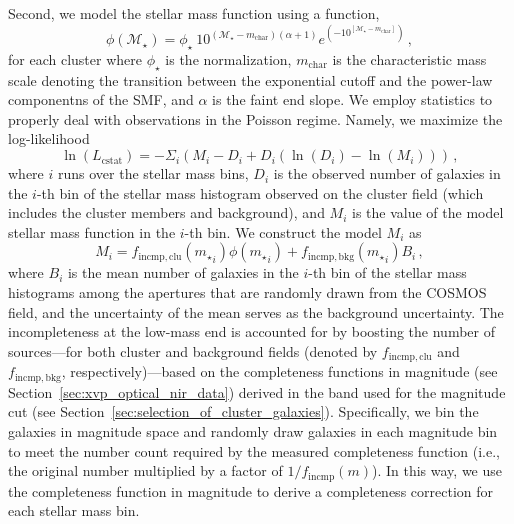 \documentclass[useAMS,usenatbib,iop,numberedappendix]{mn2e}
\newcommand{\mstar}{\ensuremath{m_{\star}}}
\begin{document}
Second, we model the stellar mass function using a \citet{schechter76} function,
\[
\phi(\mathcal{M}_{\star}) = 
\phi_{\star}~
10^{
(\mathcal{M}_{\star} - m_{\mathrm{char}})
(\alpha + 1)
} 
e^{ (-10^{[\mathcal{M}_{\star} - m_{\mathrm{char}}] }) } \, ,
\]
for each cluster where $\phi_{\star}$ is the normalization, $m_\mathrm{char}$ is the characteristic mass scale denoting the transition between the exponential cutoff and the power-law componentns of the SMF, and $\alpha$ is the faint end slope.  We employ \citet{cash79} statistics to properly deal with observations in the Poisson regime.  Namely, we maximize the log-likelihood
%
\begin{equation}
\label{eq:cstat}
\ln\left( L_{\mathrm{cstat}} \right) = -\Sigma_{i}\left( M_{i} - D_{i} + D_{i}(\ln(D_{i}) - \ln(M_{i}) ) \right) \, ,
\end{equation}
%
where $i$ runs over the stellar mass bins, $D_i$ is the observed number of galaxies in the $i$-th bin of the stellar mass histogram observed on the cluster field (which includes the cluster members and background), and $M_i$ is the value of the model stellar mass function in the $i$-th bin.
We construct the model $M_i$ as
\[
M_i = f_{\mathrm{incmp, clu}}({\mstar}_{i}) \phi({\mstar}_{i}) + f_{\mathrm{incmp, bkg}}({\mstar}_{i}) B_i  \, ,
\]
where $B_i$ is the mean number of galaxies in the $i$-th bin of the stellar mass histograms among the apertures that are randomly drawn from the COSMOS field, and the uncertainty of the mean serves as the background uncertainty.
The incompleteness at the low-mass end is accounted for by 
boosting 
the number of sources---for both cluster and background fields (denoted by $f_{\mathrm{incmp, clu}}$ and $f_{\mathrm{incmp, bkg}}$, respectively)---based on the completeness functions in magnitude (see Section~\ref{sec:xvp_optical_nir_data}) derived in the band used for the magnitude cut (see Section~\ref{sec:selection_of_cluster_galaxies}).
Specifically, we bin the galaxies in magnitude space and randomly draw galaxies in each magnitude bin to meet the number count required by the measured completeness function (i.e., the original number multiplied by a factor of $1/f_{\mathrm{incmp}}(m)$).  In this way, we use the completeness function in magnitude to derive a completeness correction for each stellar mass bin.
\end{document}

